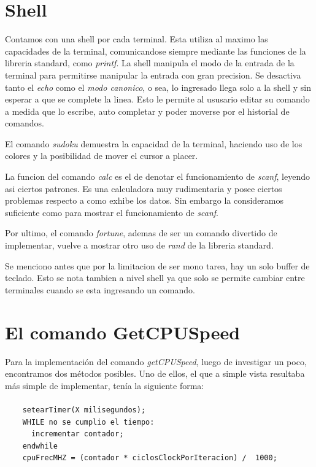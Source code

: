 \documentclass[a4paper,10pt]{article}
\begin{document}
\section{Shell}
    Contamos con una shell por cada terminal.
    Esta utiliza al maximo las capacidades de la terminal, comunicandose siempre mediante las funciones de la libreria standard, como \textit{printf}.
    La shell manipula el modo de la entrada de la terminal para permitirse manipular la entrada con gran precision.
    Se desactiva tanto el \textit{echo} como el \textit{modo canonico}, o sea, lo ingresado llega solo a la shell y sin esperar a que se complete la linea.
    Esto le permite al ususario editar su comando a medida que lo escribe, auto completar y poder moverse por el historial de comandos.

    El comando \textit{sudoku} demuestra la capacidad de la terminal, haciendo uso de los colores y la posibilidad de mover el cursor a placer.
    
    La funcion del comando \textit{calc} es el de denotar el funcionamiento de \textit{scanf}, leyendo asi ciertos patrones.
    Es una calculadora muy rudimentaria y posee ciertos problemas respecto a como exhibe los datos.
    Sin embargo la consideramos suficiente como para mostrar el funcionamiento de \textit{scanf}.
    
    Por ultimo, el comando \textit{fortune}, ademas de ser un comando divertido de implementar, vuelve a mostrar otro uso de \textit{rand} de la libreria standard.

    Se menciono antes que por la limitacion de ser mono tarea, hay un solo buffer de teclado.
    Esto se nota tambien a nivel shell ya que solo se permite cambiar entre terminales cuando se esta ingresando un comando.

\newpage
\section{El comando GetCPUSpeed}
    Para la implementación del comando \textit{getCPUSpeed}, luego de investigar un poco, encontramos dos métodos posibles. Uno de ellos, el que a simple vista resultaba
    más simple de implementar, tenía la siguiente forma:
    \paragraph*{}
    \begin{lstlisting}
    setearTimer(X milisegundos);
    WHILE no se cumplio el tiempo:
	  incrementar contador;
    endwhile
    cpuFrecMHZ = (contador * ciclosClockPorIteracion) /  1000;
    \end{lstlisting}
\end{document}

